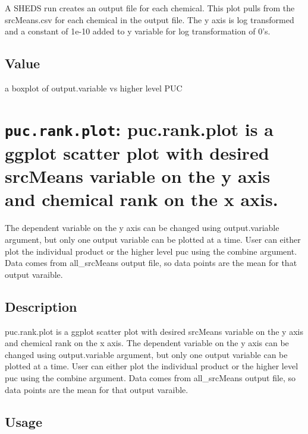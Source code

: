 \documentclass[
]{article}
\begin{document}
A SHEDS run creates an output file for each chemical. This plot pulls
from the srcMeans.csv for each chemical in the output file. The y axis
is log transformed and a constant of 1e-10 added to y variable for log
transformation of 0's.

\hypertarget{value-27}{%
\subsection{Value}\label{value-27}}

a boxplot of output.variable vs higher level PUC

\hypertarget{puc.rank.plot-puc.rank.plot-is-a-ggplot-scatter-plot-with-desired-srcmeans-variable-on-the-y-axis-and-chemical-rank-on-the-x-axis.}{%
\section{\texorpdfstring{\texttt{puc.rank.plot}: puc.rank.plot is a
ggplot scatter plot with desired srcMeans variable on the y axis and
chemical rank on the x
axis.}{puc.rank.plot: puc.rank.plot is a ggplot scatter plot with desired srcMeans variable on the y axis and chemical rank on the x axis.}}\label{puc.rank.plot-puc.rank.plot-is-a-ggplot-scatter-plot-with-desired-srcmeans-variable-on-the-y-axis-and-chemical-rank-on-the-x-axis.}}

The dependent variable on the y axis can be changed using
output.variable argument, but only one output variable can be plotted at
a time. User can either plot the individual product or the higher level
puc using the combine argument. Data comes from all\_srcMeans output
file, so data points are the mean for that output varaible.

\hypertarget{description-33}{%
\subsection{Description}\label{description-33}}

puc.rank.plot is a ggplot scatter plot with desired srcMeans variable on
the y axis and chemical rank on the x axis. The dependent variable on
the y axis can be changed using output.variable argument, but only one
output variable can be plotted at a time. User can either plot the
individual product or the higher level puc using the combine argument.
Data comes from all\_srcMeans output file, so data points are the mean
for that output varaible.

\hypertarget{usage-33}{%
\subsection{Usage}\label{usage-33}}
\end{document}
